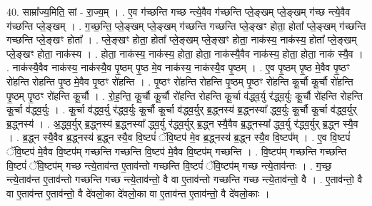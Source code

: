 \documentclass[17pt]{extarticle}
\begin{document}
40. साम्रा᳚ज्य॒मिति॒ सां - रा॒ज्य॒म् । . ए॒व ग॑च्छन्ति गच्छ न्त्ये॒वैव ग॑च्छन्ति प्ले॒ङ्‍खम् प्ले॒ङ्‍खम् ग॑च्छ न्त्ये॒वैव ग॑च्छन्ति प्ले॒ङ्‍खम् । . ग॒च्छ॒न्ति॒ प्ले॒ङ्‍खम् प्ले॒ङ्‍खम् ग॑च्छन्ति गच्छन्ति प्ले॒ङ्‍खꣳ होता॒ होता᳚ प्ले॒ङ्‍खम् ग॑च्छन्ति गच्छन्ति प्ले॒ङ्‍खꣳ होता᳚ । . प्ले॒ङ्‍खꣳ होता॒ होता᳚ प्ले॒ङ्‍खम् प्ले॒ङ्‍खꣳ होता॒ नाक॑स्य॒ नाक॑स्य॒ होता᳚ प्ले॒ङ्‍खम् प्ले॒ङ्‍खꣳ होता॒ नाक॑स्य । . होता॒ नाक॑स्य॒ नाक॑स्य॒ होता॒ होता॒ नाक॑स्यै॒वैव नाक॑स्य॒ होता॒ होता॒ नाक॑ स्यै॒व । . नाक॑स्यै॒वैव नाक॑स्य॒ नाक॑स्यै॒व पृ॒ष्ठम् पृ॒ष्ठ मे॒व नाक॑स्य॒ नाक॑स्यै॒व पृ॒ष्ठम् । . ए॒व पृ॒ष्ठम् पृ॒ष्ठ मे॒वैव पृ॒ष्ठꣳ रो॑हन्ति रोहन्ति पृ॒ष्ठ मे॒वैव पृ॒ष्ठꣳ रो॑हन्ति । . पृ॒ष्ठꣳ रो॑हन्ति रोहन्ति पृ॒ष्ठम् पृ॒ष्ठꣳ रो॑हन्ति कू॒र्चौ कू॒र्चौ रो॑हन्ति पृ॒ष्ठम् पृ॒ष्ठꣳ रो॑हन्ति कू॒र्चौ । . रो॒ह॒न्ति॒ कू॒र्चौ कू॒र्चौ रो॑हन्ति रोहन्ति कू॒र्चा व॑द्ध्व॒र्यु र॑द्ध्व॒र्युः कू॒र्चौ रो॑हन्ति रोहन्ति कू॒र्चा व॑द्ध्व॒र्युः । . कू॒र्चा व॑द्ध्व॒र्यु र॑द्ध्व॒र्युः कू॒र्चौ कू॒र्चा व॑द्ध्व॒र्युर् ब्र॒द्ध्नस्य॑ ब्र॒द्ध्नस्या᳚ द्ध्व॒र्युः कू॒र्चौ कू॒र्चा व॑द्ध्व॒र्युर् ब्र॒द्ध्नस्य॑ । . अ॒द्ध्व॒र्युर् ब्र॒द्ध्नस्य॑ ब्र॒द्ध्नस्या᳚ द्ध्व॒र्यु र॑द्ध्व॒र्युर् ब्र॒द्ध्न स्यै॒वैव ब्र॒द्ध्नस्या᳚ द्ध्व॒र्यु र॑द्ध्व॒र्युर् ब्र॒द्ध्न स्यै॒व । . ब्र॒द्ध्न स्यै॒वैव ब्र॒द्ध्नस्य॑ ब्र॒द्ध्न स्यै॒व वि॒ष्टपं॑ ॅवि॒ष्टप॑ मे॒व ब्र॒द्ध्नस्य॑ ब्र॒द्ध्न स्यै॒व वि॒ष्टप᳚म् । . ए॒व वि॒ष्टपं॑ ॅवि॒ष्टप॑ मे॒वैव वि॒ष्टप॑म् गच्छन्ति गच्छन्ति वि॒ष्टप॑ मे॒वैव वि॒ष्टप॑म् गच्छन्ति । . वि॒ष्टप॑म् गच्छन्ति गच्छन्ति वि॒ष्टपं॑ ॅवि॒ष्टप॑म् गच्छ न्त्ये॒ताव॑न्त ए॒ताव॑न्तो गच्छन्ति वि॒ष्टपं॑ ॅवि॒ष्टप॑म् गच्छ न्त्ये॒ताव॑न्तः । . ग॒च्छ॒ न्त्ये॒ताव॑न्त ए॒ताव॑न्तो गच्छन्ति गच्छ न्त्ये॒ताव॑न्तो॒ वै वा ए॒ताव॑न्तो गच्छन्ति गच्छ न्त्ये॒ताव॑न्तो॒ वै । . ए॒ताव॑न्तो॒ वै वा ए॒ताव॑न्त ए॒ताव॑न्तो॒ वै दे॑वलो॒का दे॑वलो॒का वा ए॒ताव॑न्त ए॒ताव॑न्तो॒ वै दे॑वलो॒काः । \newline
\end{document}
